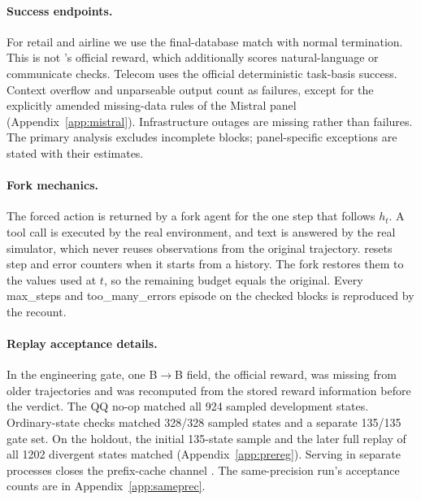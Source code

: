 \paragraph{Success endpoints.} For retail and airline we use the final-database match with normal termination. This is not \tautwo{}'s official reward, which additionally scores natural-language or communicate checks. Telecom uses the official deterministic task-basis success. Context overflow and unparseable output count as failures, except for the explicitly amended missing-data rules of the Mistral panel (Appendix~\ref{app:mistral}). Infrastructure outages are missing rather than failures. The primary analysis excludes incomplete blocks; panel-specific exceptions are stated with their estimates.

\paragraph{Fork mechanics.} The forced action is returned by a fork agent for the one step that follows $h_t$. A tool call is executed by the real environment, and text is answered by the real simulator, which never reuses observations from the original trajectory. \tautwo{} resets step and error counters when it starts from a history. The fork restores them to the values used at $t$, so the remaining budget equals the original. Every max\_steps and too\_many\_errors episode on the checked blocks is reproduced by the recount. %
\paragraph{Replay acceptance details.} In the engineering gate, one B$\rightarrow$B field, the official reward, was missing from older trajectories and was recomputed from the stored reward information before the verdict. The QQ no-op matched all 924 sampled development states. Ordinary-state checks matched 328/328 sampled states and a separate 135/135 gate set. On the holdout, the initial 135-state sample and the later full replay of all 1202 divergent states matched (Appendix~\ref{app:prereg}). Serving in separate processes closes the prefix-cache channel \citep{patodiya2026same}. %
The same-precision run's acceptance counts are in Appendix~\ref{app:sameprec}.


